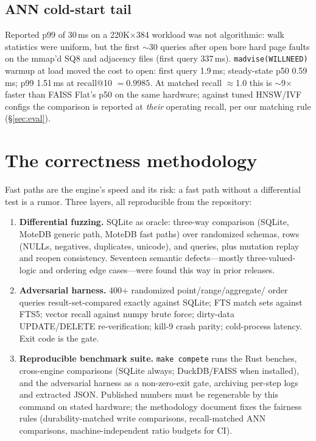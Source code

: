 \documentclass[10pt]{article}
\begin{document}
\subsection{ANN cold-start tail}
\label{sec:cases:f1}
Reported p99 of 30\,ms on a 220K$\times$384 workload was not algorithmic:
walk statistics were uniform, but the first $\sim$30 queries after open bore
hard page faults on the mmap'd SQ8 and adjacency files (first query
337\,ms). \texttt{madvise(WILLNEED)} warmup at load moved the cost to open:
first query 1.9\,ms; steady-state p50 0.59\,ms; p99 1.51\,ms at
recall@10 $= 0.9985$. At matched recall $\approx$1.0 this is $\sim$9$\times$
faster than FAISS Flat's p50 on the same hardware; against tuned
HNSW/IVF configs the comparison is reported at \emph{their} operating
recall, per our matching rule (\S\ref{sec:eval}).

\section{The correctness methodology}
\label{sec:correct}

Fast paths are the engine's speed and its risk: a fast path without a
differential test is a rumor. Three layers, all reproducible from the
repository:

\begin{enumerate}
\item \textbf{Differential fuzzing.} SQLite as oracle: three-way comparison
(SQLite, MoteDB generic path, MoteDB fast paths) over randomized schemas,
rows (NULLs, negatives, duplicates, unicode), and queries, plus mutation
replay and reopen consistency. Seventeen semantic defects---mostly
three-valued-logic and ordering edge cases---were found this way in prior
releases.
\item \textbf{Adversarial harness.} 400+ randomized point/range/aggregate/
order queries result-set-compared exactly against SQLite; FTS match sets
against FTS5; vector recall against numpy brute force; dirty-data
UPDATE/DELETE re-verification; kill-9 crash parity; cold-process latency.
Exit code is the gate.
\item \textbf{Reproducible benchmark suite.} \texttt{make compete} runs the
Rust benches, cross-engine comparisons (SQLite always; DuckDB/FAISS when
installed), and the adversarial harness as a non-zero-exit gate, archiving
per-step logs and extracted JSON. Published numbers must be regenerable by
this command on stated hardware; the methodology document fixes the
fairness rules (durability-matched write comparisons, recall-matched ANN
comparisons, machine-independent ratio budgets for CI).
\end{enumerate}
\end{document}
